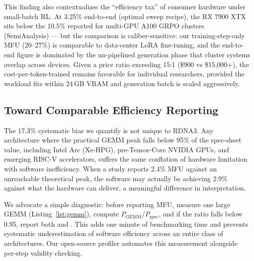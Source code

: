 This finding also contextualizes the ``efficiency tax'' of consumer hardware under small-batch RL. At 3.25\% end-to-end \mfuprac{} (optimal sweep recipe), the RX 7900 XTX sits below the 10.5\% reported for multi-GPU A100 GRPO clusters (SemiAnalysis) --- but the comparison is caliber-sensitive: our training-step-only MFU (20--27\%) is comparable to data-center LoRA fine-tuning, and the end-to-end figure is dominated by the un-pipelined generation phase that cluster systems overlap across devices. Given a price ratio exceeding 15:1 (\$900 vs \$15,000+), the cost-per-token-trained remains favorable for individual researchers, provided the workload fits within 24\,GB VRAM and generation batch is scaled aggressively.

\subsection{Toward Comparable Efficiency Reporting}

The 17.3\% systematic bias we quantify is not unique to RDNA3. Any architecture where the practical GEMM peak falls below 95\% of the spec-sheet value, including Intel Arc (Xe-HPG), pre-Tensor-Core NVIDIA GPUs, and emerging RISC-V accelerators, suffers the same conflation of hardware limitation with software inefficiency. When a study reports 2.4\% MFU against an unreachable theoretical peak, the software may actually be achieving 2.9\% against what the hardware can deliver, a meaningful difference in interpretation.

We advocate a simple diagnostic: before reporting MFU, measure one large GEMM (Listing~\ref{lst:gemm}), compute $P_{\text{GEMM}}/P_{\text{spec}}$, and if the ratio falls below 0.95, report both \mfutheo{} and \mfuprac{}. This adds one minute of benchmarking time and prevents systematic underestimation of software efficiency across an entire class of architectures. Our open-source profiler automates this measurement alongside per-step validity checking.
